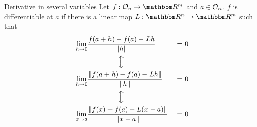 \documentclass[Analysis-3]{subfiles}
\begin{document}
\begin{Def}{Derivative in several variables}{}
  Let $ f : {\cal O}_n \to \R^m $ and $ a \in {\cal O}_n $. $ f $ is differentiable at $ a $ if there is a linear map $ L : \R^n \to \R^m $ such that
  \begin{alignat*}{2}
    \lim_{h \to 0} & \frac{f(a+h)-f(a)-Lh}{\norm{h}}            &  & = 0 \\
                   & \qquad \qquad \,\,\Big \Updownarrow                 \\
    \lim_{h \to 0} & \frac{\norm{f(a+h)-f(a)-Lh}}{\norm{h}}     &  & = 0 \\
                   & \qquad \qquad \,\, \Big \Updownarrow                \\
    \lim_{x \to a} & \frac{\norm{f(x)-f(a)-L(x-a)}}{\norm{x-a}} &  & = 0 \\
  \end{alignat*}
\end{Def}
\end{document}
